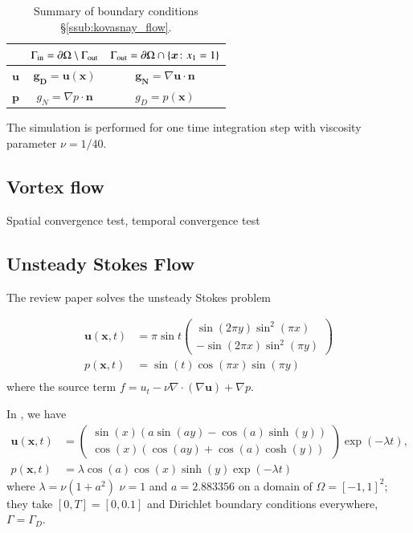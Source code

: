 \begin{table}[htpb]
  \centering
  \begin{tabular}{ccc}
  \hline
    & $\Gamma_{\text{in}} = \partial\Omega \setminus \Gamma_{\text{out}}$ & $\Gamma_{\text{out}} = \partial\Omega \cap \left\{\bm{x}\colon x_1 = 1\right\}$ \\
  \hline
  $\bm{u}$ & $\bm{g_D} = \bm{u}(\bm{x})$ & $\bm{g_N} = \nabla \bm{u}\cdot\bm{n}$ \\
  $\bm{p}$ & $g_N = \nabla p\cdot\bm{n}$ & $g_D = p(\bm{x})$ \\
  \hline
  \end{tabular}
  \caption{Summary of boundary conditions \S\ref{ssub:kovasnay_flow}.}
  \label{tab:Kovasnay_BCs}
\end{table}

The simulation is performed for one time integration step with viscosity parameter $\nu = 1/40$.

\subsection{Vortex flow}
Spatial convergence test, temporal convergence test

\subsection{Unsteady Stokes Flow}

The review paper \cite{guermond_overview_2006} solves the unsteady Stokes problem

\begin{equation}
  \begin{aligned}
    \bm{u}(\bm{x}, t) &= \pi \sin t 
    \begin{pmatrix}
      \sin( 2\pi y) \sin^2( \pi x) \\
      -\sin(2 \pi x) \sin^2(\pi y)
    \end{pmatrix} \\
    p(\bm{x}, t) &= \sin(t)\cos(\pi x) \sin(\pi y)\\
  \end{aligned}
  \label{eq:MS_stokes_guermond}
\end{equation}
where the source term $f= u_t -\nu \nabla \cdot( \nabla \bm{u} ) + \nabla p $.

In \cite{fehn_stability_2017}, we have
\begin{equation}
  \begin{aligned}
  \bm{u}(\bm{x}, t) &= 
  \begin{pmatrix}
    \sin(x) (a\sin(a y) - \cos(a)\sinh(y)) \\
    \cos(x) (\cos(a y) + \cos(a)\cosh(y))
  \end{pmatrix}
  \exp(-\lambda t),\\
    p(\bm{x}, t) &= \lambda \cos(a) \cos(x) \sinh(y) \exp(-\lambda t)
  \end{aligned}
  \label{eq:MS_unsteady_stokes_fehn}
\end{equation}
where $\lambda = \nu(1 + a^2)$ $\nu = 1$ and $a = 2.883356$ on a domain of  $\Omega = [-1, 1]^2$; they take $[0, T] = [0, 0.1]$ and Dirichlet boundary conditions everywhere, $\Gamma = \Gamma_D$.





